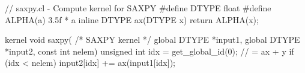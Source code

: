 // saxpy.cl - Compute kernel for SAXPY
#define DTYPE float
#define ALPHA(a) 3.5f * a
inline DTYPE ax(DTYPE x) { return ALPHA(x); }

kernel void saxpy( /* SAXPY kernel */
    global DTYPE *input1,
    global DTYPE *input2,
    const int nelem)
{
     unsigned int idx = get_global_id(0);
     // = ax + y
     if (idx < nelem) {
         input2[idx] += ax(input1[idx]); }
}
